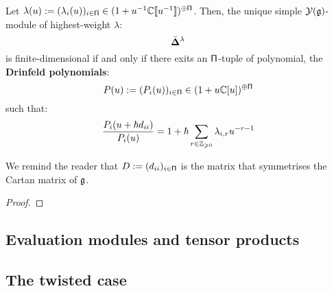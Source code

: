         \begin{theorem} \label{theorem: classification_of_finite_dimensional_simple_modules_of_finite_untwisted_yangians}
            Let $\lambda(u) := ( \lambda_i(u) )_{i \in \mathsf{\Pi}} \in (1 + u^{-1}\mathbb{C}[\![u^{-1}]\!])^{\oplus \mathsf{\Pi}}$. Then, the unique simple $\mathcal{Y}(\mathfrak{g})$-module of highest-weight $\lambda$:
                $$\bar{ \mathbf{ \Delta } }^{\lambda}$$
            is finite-dimensional if and only if there exits an $\mathsf{\Pi}$-tuple of polynomial, the \textbf{Drinfeld polynomials}:
                $$P(u) := ( P_i(u) )_{i \in \mathsf{\Pi}} \in (1 + u\mathbb{C}[u])^{\oplus \mathsf{\Pi}}$$
            such that:
                $$\frac{P_i(u + \hbar d_{ii})}{P_i(u)} = 1 + \hbar \sum_{r \in \mathbb{Z}_{\geqslant 0}} \lambda_{i, r} u^{-r - 1}$$
        \end{theorem}
        We remind the reader that $D := (d_{ii})_{i \in \mathsf{\Pi}}$ is the matrix that symmetrises the Cartan matrix of $\mathfrak{g}$.
            \begin{proof}
                
            \end{proof}
        \begin{definition} \label{def: dominant_integral_weights_yangians}
            
        \end{definition}


    \subsection{Evaluation modules and tensor products}

    \subsection{The twisted case}